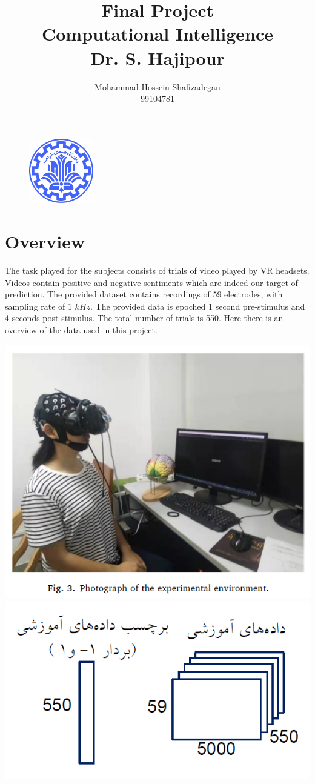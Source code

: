 \documentclass[]{article}
\author{
	Mohammad Hossein Shafizadegan\\
	99104781
}
\title{
	Final Project \\
	Computational Intelligence  \\
	Dr. S. Hajipour
}
\begin{document}
	\begin{figure}
		\includegraphics[width=0.25\textwidth]{Fig/Sharif.png}
		\centering
	\end{figure}
	\maketitle
	\tableofcontents
	\newpage
	\section{Overview}
	The task played for the subjects consists of trials of video played by VR headsets. Videos contain positive and negative sentiments which are indeed our target of prediction. The provided dataset contains recordings of 59 electrodes, with sampling rate of $1 \,\, kHz$. The provided data is epoched 1 second pre-stimulus and 4 seconds post-stimulus. The total number of trials is 550. Here there is an overview of the data used in this project.
	
	\begin{center}
		\includegraphics[width=0.4\linewidth]{Fig/F1.png}
		\qquad\qquad
		\includegraphics[width=0.4\linewidth]{Fig/F2.png}
	\end{center}
\end{document}
